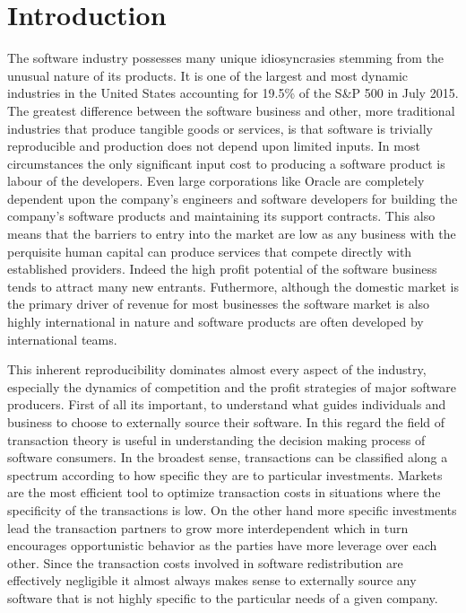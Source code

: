 \section*{Introduction}

The software industry possesses many unique idiosyncrasies stemming from the unusual nature of its products.
It is one of the largest and most dynamic industries in the United States accounting for 19.5\% of the S\&P 500 in July 2015.\autocite[6]{SurveysSoftware2015}
The greatest difference between the software business and other, more traditional industries that produce tangible goods or services, is that software is trivially reproducible and production does not depend upon limited inputs.\autocite[3]{buxmann2012software}
In most circumstances the only significant input cost to producing a software product is labour of the developers.
Even large corporations like Oracle are completely dependent upon the company's engineers and software developers for building the company's software products and maintaining its support contracts.\autocite[115]{finkle2012larry}
This also means that the barriers to entry into the market are low as any business with the perquisite human capital can produce services that compete directly with established providers.\autocite[115]{finkle2012larry}
Indeed the high profit potential of the software business tends to attract many new entrants.\autocite[]{finkle2012larry}
Futhermore, although the domestic market is the primary driver of revenue for most businesses\autocite[]{ITSoftwareEconomist} the software market is also highly international in nature and software products are often developed by international teams.\autocite[3]{buxmann2012software}

This inherent reproducibility dominates almost every aspect of the industry, especially the dynamics of competition and the profit strategies of major software producers.
First of all its important, to understand what guides individuals and business to choose to externally source their software.
In this regard the field of transaction theory is useful in understanding the decision making process of software consumers.
In the broadest sense, transactions can be classified along a spectrum according to how specific they are to particular investments.
Markets are the most efficient tool to optimize transaction costs in situations where the specificity of the transactions is low.
On the other hand more specific investments lead the transaction partners to grow more interdependent which in turn encourages opportunistic behavior as the parties have more leverage over each other.\autocite[44]{buxmann2012software}
Since the transaction costs involved in software redistribution are effectively negligible it almost always makes sense to externally source any software that is not highly specific to the particular needs of a given company.

